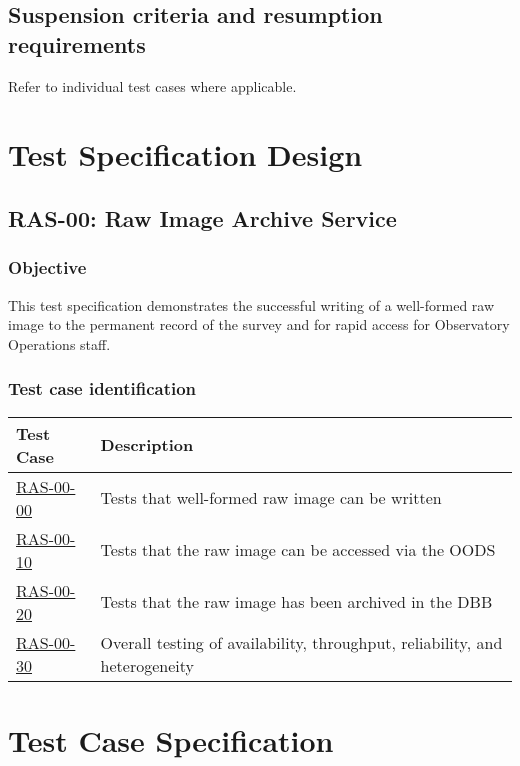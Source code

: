\documentclass[DM,lsstdraft,STS,toc]{lsstdoc}
\begin{document}
\subsection{Suspension criteria and resumption requirements}
\label{suspension}


Refer to individual test cases where applicable.


\section{Test Specification Design}
\label{sec:Test Specification Design}
\subsection{RAS-00: Raw Image Archive Service}


\subsubsection{Objective}
This test specification demonstrates the successful writing of a
well-formed raw image to the permanent record of the survey and
for rapid access for Observatory Operations staff.


\subsubsection{Test case identification}


\begin{longtable} {|p{}|p{}|}\hline
\textbf{Test Case} & \textbf{Description} \\\hline
\hyperref[ras-00-00]{RAS-00-00} & Tests that well-formed raw image can be written \\\hline
\hyperref[ras-00-10]{RAS-00-10} & Tests that the raw image can be accessed via the OODS \\\hline
\hyperref[ras-00-20]{RAS-00-20} & Tests that the raw image has been archived in the DBB \\\hline
\hyperref[ras-00-30]{RAS-00-30} & Overall testing of availability, throughput, reliability, and heterogeneity \\\hline
\end{longtable}


\section{Test Case Specification}
\end{document}
